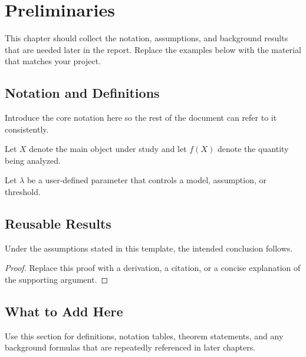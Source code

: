 \chapter{Preliminaries}

This chapter should collect the notation, assumptions, and background results that are needed later in the report. Replace the examples below with the material that matches your project.

\section{Notation and Definitions}

Introduce the core notation here so the rest of the document can refer to it consistently.

\begin{definition}
Let $X$ denote the main object under study and let $f(X)$ denote the quantity being analyzed.
\end{definition}

\begin{definition}
Let $\lambda$ be a user-defined parameter that controls a model, assumption, or threshold.
\end{definition}

\section{Reusable Results}

\begin{theorem}
Under the assumptions stated in this template, the intended conclusion follows.
\end{theorem}

\begin{proof}
Replace this proof with a derivation, a citation, or a concise explanation of the supporting argument.
\end{proof}

\section{What to Add Here}

Use this section for definitions, notation tables, theorem statements, and any background formulas that are repeatedly referenced in later chapters.
